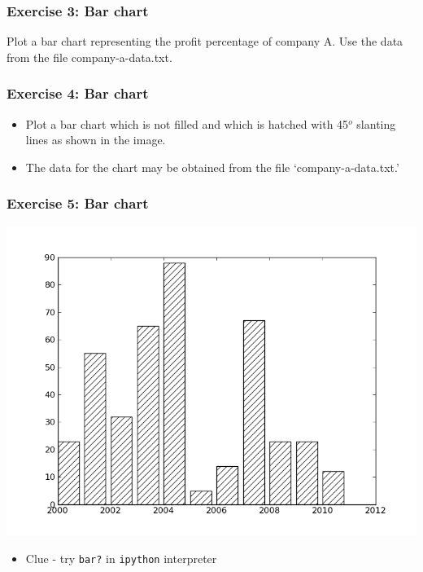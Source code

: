 \documentclass[17pt]{beamer}
\begin{document}
\begin{frame}[fragile]
\frametitle{Exercise 3: Bar chart}
Plot a bar chart representing the profit percentage of company A. Use the data from the file company-a-data.txt.
\end{frame}
\begin{frame}
\frametitle{Exercise 4: Bar chart}
\begin{itemize}
\item Plot a bar chart which is not filled and which is hatched with
45$^o$ slanting lines as shown in the image.
\item The data for the chart may be obtained from the file `company-a-data.txt.'
\end{itemize}
\end{frame}
\begin{frame}
\frametitle{Exercise 5: Bar chart}
\begin{center}
\includegraphics[scale=0.3]{bar-chart-hatch.png}
\end{center}
\begin{itemize}
\item {Clue} - try \texttt{bar?} in \texttt{ipython} interpreter
\end{itemize}
\end{frame}
\end{document}
